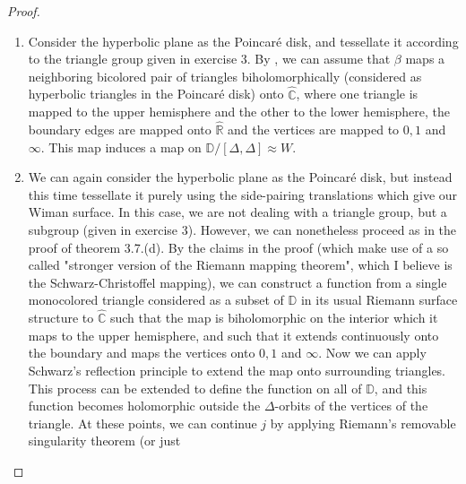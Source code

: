 \documentclass[reqno]{amsart}
\theoremstyle{definition}
\theoremstyle{remark}
\begin{document}
\begin{proof}
        \begin{enumerate}
            \item Consider
        the hyperbolic plane as the Poincaré disk, and tessellate it
        according to the triangle group
        given in exercise 3.
        By \cite[Thm 3.7.(d)]{JW}, we can assume that $\beta$ maps
        a neighboring bicolored pair of triangles biholomorphically (considered
        as hyperbolic triangles in the Poincaré disk) onto
        $\hat{\mathbb{C}}$, where one triangle is mapped to the upper hemisphere
        and the other to the lower hemisphere, the boundary edges are mapped
        onto $\hat{\mathbb{R}}$ and the vertices are mapped to $0,1$ and $\infty$. This map induces
        a map on $\mathbb{D}/
        \left[\Delta, \Delta \right] 
        \approx W$.
        \item 
        We can again consider the
        hyperbolic plane as the Poincaré
        disk, but instead this time tessellate it purely using the
        side-pairing translations
        which give our Wiman surface.
        In this case, we are not dealing with a triangle group, but a subgroup (given in exercise 3). However, we can
        nonetheless proceed as in the
        proof of theorem 3.7.(d). 
        By the claims in the proof (which make use of a so called "stronger version of the Riemann mapping theorem", which I believe is the Schwarz-Christoffel mapping), we 
        can construct a function from
        a single monocolored triangle
        considered as a subset of $\mathbb{D}$ in its usual Riemann surface structure
        to $\hat{\mathbb{C}}$ such that
        the map is biholomorphic on the
        interior which it maps to
        the upper hemisphere, and such that it extends continuously onto
        the boundary and maps
        the vertices onto $0, 1$ and $\infty$. Now we can apply Schwarz's reflection principle to
        extend the map onto surrounding triangles. This process can be extended to define the function
        on all of $\mathbb{D}$, and this function becomes holomorphic outside the $\Delta$-orbits of
        the vertices of the triangle. At
        these points, we can continue
        $j$ by applying Riemann's removable singularity theorem (or just 
        \end{enumerate}
        

    


\end{proof}
\end{document}
